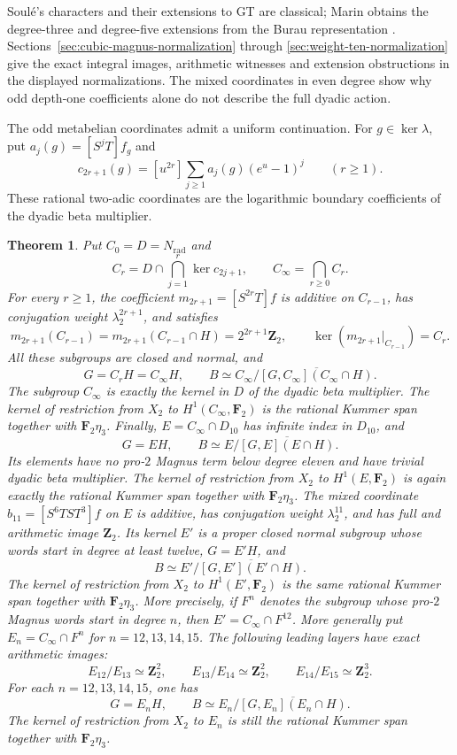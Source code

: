 \documentclass[11pt,a4paper]{article}
\newtheorem{theorem}{Theorem}[section]
\theoremstyle{definition}
\theoremstyle{remark}
\newcommand{\Z}{\mathbf Z}
\newcommand{\F}{\mathbf F}
\begin{document}
Soul\'e's characters and their extensions to GT are classical;
Marin obtains the degree-three and degree-five extensions from the
Burau representation \cite[\S6.3, p.~780]{Marin2008}.
Sections~\ref{sec:cubic-magnus-normalization} through
\ref{sec:weight-ten-normalization} give the exact integral images,
arithmetic witnesses and extension obstructions in the displayed
normalizations. The mixed coordinates in even degree show why
odd depth-one coefficients alone do not describe the full dyadic action.

The odd metabelian coordinates admit a uniform continuation. For
$g\in\ker\lambda$, put $a_j(g)=[S^jT]f_g$ and
\[
 c_{2r+1}(g)=[u^{2r}]\sum_{j\ge1}a_j(g)(e^u-1)^j
 \qquad(r\ge1).
\]
These rational two-adic coordinates are the logarithmic boundary
coefficients of the dyadic beta multiplier.

\begin{theorem}\label{thm:main-uniform-dyadic-normalization}
Put $C_0=D=N_{\mathrm{rad}}$ and
\[
 C_r=D\cap\bigcap_{j=1}^r\ker c_{2j+1},\qquad
 C_\infty=\bigcap_{r\ge0}C_r.
\]
For every $r\ge1$, the coefficient
$m_{2r+1}=[S^{2r}T]f$ is additive on $C_{r-1}$, has conjugation
weight $\lambda_2^{2r+1}$, and satisfies
\[
 m_{2r+1}(C_{r-1})=m_{2r+1}(C_{r-1}\cap H)
                     =2^{2r+1}\Z_2,\qquad
 \ker(m_{2r+1}|_{C_{r-1}})=C_r.
\]
All these subgroups are closed and normal, and
\[
 G=C_rH=C_\infty H,\qquad
 B\simeq C_\infty/
       \overline{[G,C_\infty](C_\infty\cap H)}.
\]
The subgroup $C_\infty$ is exactly the kernel in $D$ of the dyadic
beta multiplier. The kernel of restriction from $X_2$ to
$H^1(C_\infty,\F_2)$ is the rational Kummer span together with
$\F_2\eta_3$.
Finally, $E=C_\infty\cap D_{10}$ has infinite index in $D_{10}$,
and
\[
 G=EH,\qquad B\simeq E/\overline{[G,E](E\cap H)}.
\]
Its elements have no pro-$2$ Magnus term below degree eleven and
have trivial dyadic beta multiplier. The kernel of restriction
from $X_2$ to $H^1(E,\F_2)$ is again exactly the rational Kummer
span together with $\F_2\eta_3$.
The mixed coordinate $b_{11}=[S^6TST^3]f$ on $E$ is additive,
has conjugation weight $\lambda_2^{11}$, and has full and arithmetic
image $\Z_2$. Its kernel $E'$ is a proper closed normal subgroup
whose words start in degree at least twelve,
$G=E'H$, and
\[
 B\simeq E'/\overline{[G,E'](E'\cap H)}.
\]
The kernel of restriction from $X_2$ to $H^1(E',\F_2)$ is the
same rational Kummer span together with $\F_2\eta_3$. More precisely,
if $F^n$ denotes the subgroup whose pro-$2$ Magnus words start
in degree $n$, then $E'=C_\infty\cap F^{12}$.
More generally put $E_n=C_\infty\cap F^n$ for $n=12,13,14,15$.
The following leading layers have exact arithmetic images:
\[
 E_{12}/E_{13}\simeq\Z_2^2,\qquad
 E_{13}/E_{14}\simeq\Z_2^2,\qquad
 E_{14}/E_{15}\simeq\Z_2^3.
\]
For each $n=12,13,14,15$, one has
\[
 G=E_nH,\qquad
 B\simeq E_n/\overline{[G,E_n](E_n\cap H)}.
\]
The kernel of restriction from $X_2$ to $E_n$ is still the
rational Kummer span together with $\F_2\eta_3$.
\end{theorem}
\end{document}
